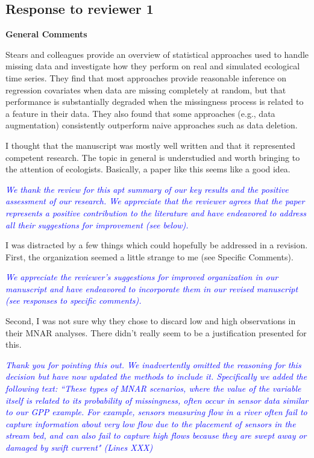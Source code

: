 \documentclass{article}
\begin{document}
\begin{linenumbers}
\section{Response to reviewer 1}
\textbf{General Comments}

\noindent Stears and colleagues provide an overview of statistical approaches used to handle missing data and investigate how they perform on real and simulated ecological time series. They find that most approaches provide reasonable inference on regression covariates when data are missing completely at random, but that performance is substantially degraded when the missingness process is related to a feature in their data. They also found that some approaches (e.g., data augmentation) consistently outperform naive approaches such as data deletion.

I thought that the manuscript was mostly well written and that it represented competent research. The topic in general is understudied and worth bringing to the attention of ecologists. Basically, a paper like this seems like a good idea. 

\noindent \textcolor{blue}{\textit{We thank the review for this apt summary of our key results and the positive assessment of our research. We appreciate that the reviewer agrees that the paper represents a positive contribution to the literature and have endeavored to address all their suggestions for improvement (see below).}}

\bigskip

\noindent I was distracted by a few things which could hopefully be addressed in a revision. First, the organization seemed a little strange to me (see Specific Comments).

\noindent \textcolor{blue}{\textit{We appreciate the reviewer's suggestions for improved organization in our manuscript and have endeavored to incorporate them in our revised manuscript (see responses to specific comments).}}

\bigskip

\noindent Second, I was not sure why they chose to discard low and high observations in their MNAR analyses. There didn’t really seem to be a justification presented for this.

\noindent \textcolor{blue}{\textit{Thank you for pointing this out. We inadvertently omitted the reasoning for this decision but have now updated the methods to include it. Specifically we added the following text: ``These types of MNAR scenarios, where the value of the variable itself is related to its probability of missingness, often occur in sensor data similar to our GPP example. For example, sensors measuring flow in a river often fail to capture information about very low flow due to the placement of sensors in the stream bed, and can also fail to capture high flows because they are swept away or damaged by swift current" (Lines XXX)}}


\end{linenumbers}
\end{document}
